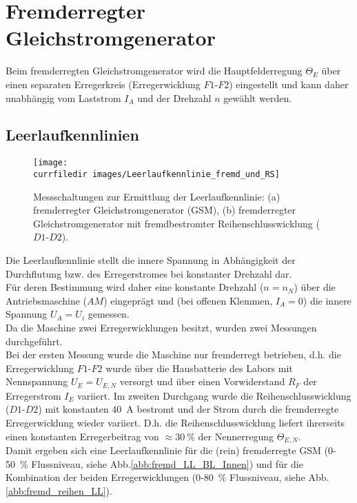 \section{Fremderregter Gleichstromgenerator}
Beim fremderregten Gleichstromgenerator wird die Hauptfelderregung $\Theta_E$ über einen separaten Erregerkreis (Erregerwicklung $F1$-$F2$) eingestellt und kann daher unabhängig vom Laststrom $I_A$ und der Drehzahl $n$ gewählt werden.\\
\subsection{Leerlaufkennlinien}
\begin{figure} [htb]
    \centering
    \texttt{[image: \\currfiledir images/Leerlaufkennlinie\_fremd\_und\_RS]}
    \caption{Messschaltungen zur Ermittlung der Leerlaufkennlinie: (a) fremderregter Gleichstromgenerator (GSM), (b) fremderregter Gleichstromgenerator mit fremdbestromter Reihenschlusswicklung ($D1$-$D2$).}
    \label{abb:fremd_LL_Messschaltung}
\end{figure}
\noindent Die Leerlaufkennlinie stellt die innere Spannung in Abhängigkeit der Durchflutung bzw. des Erregerstromes bei konstanter Drehzahl dar.\\
Für deren Bestimmung wird daher eine konstante Drehzahl ($n=n_N$) über die Antriebsmaschine ($AM$) eingeprägt und (bei offenen Klemmen, $I_A = 0$) die innere Spannung $U_A=U_i$ gemessen.\\
Da die Maschine zwei Erregerwicklungen besitzt, wurden zwei Messungen durchgeführt.\\
Bei der ersten Messung wurde die Maschine nur fremderregt betrieben, d.h. die Erregerwicklung $F1$-$F2$ wurde über die Hausbatterie des Labors mit Nennspannung $U_E=U_{E,N}$ versorgt und über einen Vorwiderstand $R_F$ der Erregerstrom $I_E$ variiert. Im zweiten Durchgang wurde die Reihenschlusswicklung ($D1$-$D2$) mit konstanten \SI{40}{\ampere} bestromt und der Strom durch die fremderregte Erregerwicklung wieder variiert. D.h. die Reihenschlusswicklung liefert ihrerseits einen konstanten Erregerbeitrag von $\approx\SI{30}{\percent}$ der Nennerregung $\Theta_{E,N}$.\\
Damit ergeben sich eine Leerlaufkennlinie für die (rein) fremderregte GSM (\SI{0}{}-\SI{50}{\percent} Flussniveau, siehe Abb.\;\ref{abb:fremd_LL_BL_Innen}) und für die Kombination der beiden Erregerwicklungen (\SI{0}{}-\SI{80}{\percent} Flussniveau, siehe Abb.\;\ref{abb:fremd_reihen_LL}).


